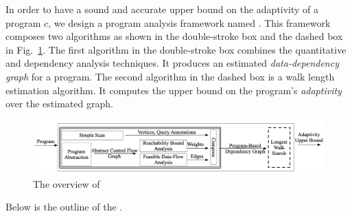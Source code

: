 In order to have a sound and accurate upper bound on the  adaptivity of a program $c$,
we design a program analysis framework named {\THESYSTEM}.
This framework composes two algorithms as shown in the double-stroke box and the dashed box in Fig.~\ref{fig:adaptfun}.
The first algorithm in the double-stroke box combines the quantitative and dependency analysis techniques.
It produces an estimated \emph{data-dependency graph} for a program.
The second algorithm in the dashed box is a walk length estimation algorithm.
It computes the upper bound on the program's \emph{adaptivity} over the estimated graph.
\begin{figure}
  \centering    
\includegraphics[width=1.0\columnwidth]{adapfun.png}
  \vspace{-0.3cm}
  \caption{The overview of {\THESYSTEM}}
  \label{fig:adaptfun}
  \vspace{-0.5cm}
\end{figure}
%
Below is the outline of the {\THESYSTEM}.
